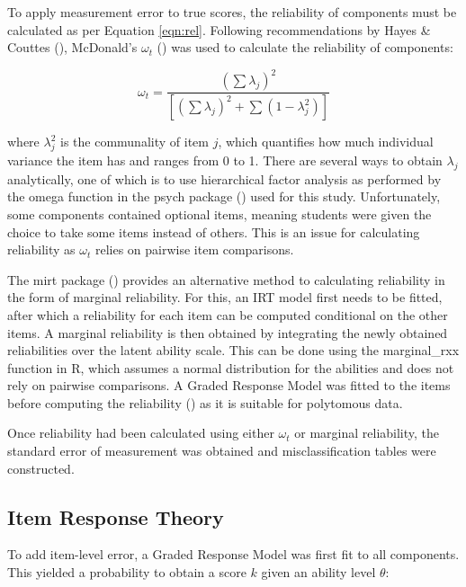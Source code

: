 \documentclass[12pt]{article}
\begin{document}
To apply measurement error to true scores, the reliability of components must be calculated as per Equation \ref{eqn:rel}. Following recommendations by Hayes \& Couttes (\cite*{hayesUseOmegaRather2020}), McDonald's $\omega_t$ (\cite{mcdonaldTestTheoryUnified1999}) was used to calculate the reliability of components:

\begin{equation}
\omega_t=\frac{\left(\sum\lambda_j\right)^2}{\left[\left(\sum \lambda_j\right)^2+\sum\left(1-\lambda_j^2\right)\right]}
\end{equation}

\noindent
where $\lambda_j^2$ is the communality of item $j$, which quantifies how much individual variance the item has and ranges from 0 to 1. There are several ways to obtain $\lambda_j$ analytically, one of which is to use hierarchical factor analysis as performed by the omega function in the psych package (\cite{psych}) used for this study. Unfortunately, some components contained optional items, meaning students were given the choice to take some items instead of others. This is an issue for calculating reliability as $\omega_t$ relies on pairwise item comparisons.

The mirt package (\cite{chalmersMirtMultidimensionalItem2012}) provides an alternative method to calculating reliability in the form of marginal reliability. For this, an IRT model first needs to be fitted, after which a reliability for each item can be computed conditional on the other items. A marginal reliability is then obtained by integrating the newly obtained reliabilities over the latent ability scale. This can be done using the marginal\_rxx function in R, which assumes a normal distribution for the abilities and does not rely on pairwise comparisons. A Graded Response Model was fitted to the items before computing the reliability (\cite{samejimaEstimationLatentAbility1969}) as it is suitable for polytomous data.

Once reliability had been calculated using either $\omega_t$ or marginal reliability, the standard error of measurement was obtained and misclassification tables were constructed.

\subsection{Item Response Theory}

To add item-level error, a Graded Response Model was first fit to all components. This yielded a probability to obtain a score $k$ given an ability level $\theta$:
\end{document}
